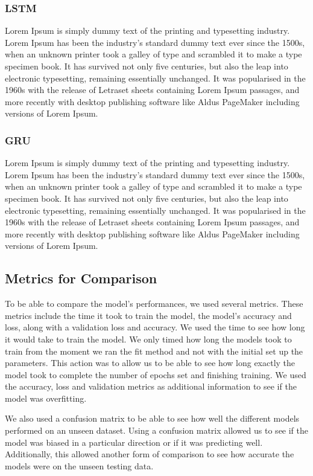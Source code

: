 \documentclass[a4paper,10pt]{article}
\begin{document}
	\subsubsection{LSTM}
		Lorem Ipsum is simply dummy text of the printing and typesetting industry. Lorem Ipsum has been the industry's standard dummy text ever since the 1500s, when an unknown printer took a galley of type and scrambled it to make a type specimen book. It has survived not only five centuries, but also the leap into electronic typesetting, remaining essentially unchanged. It was popularised in the 1960s with the release of Letraset sheets containing Lorem Ipsum passages, and more recently with desktop publishing software like Aldus PageMaker including versions of Lorem Ipsum.
	\subsubsection{GRU}
		Lorem Ipsum is simply dummy text of the printing and typesetting industry. Lorem Ipsum has been the industry's standard dummy text ever since the 1500s, when an unknown printer took a galley of type and scrambled it to make a type specimen book. It has survived not only five centuries, but also the leap into electronic typesetting, remaining essentially unchanged. It was popularised in the 1960s with the release of Letraset sheets containing Lorem Ipsum passages, and more recently with desktop publishing software like Aldus PageMaker including versions of Lorem Ipsum.

\subsection{Metrics for Comparison}
	To be able to compare the model's performances, we used several metrics. These metrics include the time it took to train the model, the model's accuracy and loss, along with a validation loss and accuracy. We used the time to see how long it would take to train the model. We only timed how long the models took to train from the moment we ran the fit method and not with the initial set up the parameters. This action was to allow us to be able to see how long exactly the model took to complete the number of epochs set and finishing training. We used the accuracy, loss and validation metrics as additional information to see if the model was overfitting. 

	We also used a confusion matrix to be able to see how well the different models performed on an unseen dataset. Using a confusion matrix allowed us to see if the model was biased in a particular direction or if it was predicting well. Additionally, this allowed another form of comparison to see how accurate the models were on the unseen testing data.
	
\end{document}

